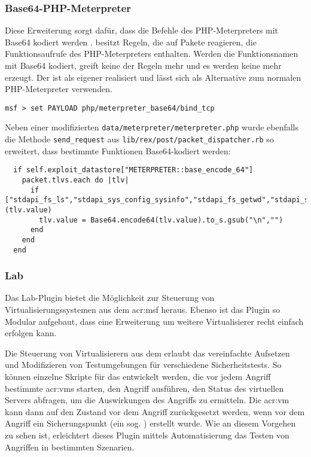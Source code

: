 \subsubsection{Base64-PHP-Meterpreter}
\label{base64-php-meterpreter}
\authors{\BK}{\HM \and \LM \and \DE \and \MW}

Diese Erweiterung sorgt dafür, dass die Befehle des PHP-Meterpreters
mit Base64 kodiert werden \cite{rfc4648}.  besitzt Regeln, die auf Pakete
reagieren, die Funktionsaufrufe des PHP-Meterpreters enthalten. Werden
die Funktionsnamen mit Base64 kodiert, greift keine der Regeln mehr und
es werden keine  mehr erzeugt.
Der  ist als eigener  realisiert und lässt sich als
Alternative zum normalen PHP-Meterpreter verwenden.

\begin{lstlisting}[language={}]
  msf > set PAYLOAD php/meterpreter_base64/bind_tcp
\end{lstlisting}

Neben einer modifizierten \texttt{data/meterpreter/meterpreter.php} wurde
ebenfalls die Methode \texttt{send\_request} aus
\texttt{lib/rex/post/packet\_dispatcher.rb} so erweitert, dass bestimmte
Funktionen Base64-kodiert werden:

\begin{lstlisting}
  if self.exploit_datastore["METERPRETER::base_encode_64"]
    packet.tlvs.each do |tlv|
      if ["stdapi_fs_ls","stdapi_sys_config_sysinfo","stdapi_fs_getwd","stdapi_sys_config_getuid"].member?(tlv.value)
        tlv.value = Base64.encode64(tlv.value).to_s.gsub("\n","")
      end
    end
  end
\end{lstlisting}

\subsubsection{Lab}
\label{lab}
\authors{\DH}{\LM \and \DE \and \MW}

Das Lab-Plugin bietet die Möglichkeit zur Steuerung von
Virtualisierungssystemen aus dem \gls{acr:msf} heraus. Ebenso ist das
Plugin so Modular aufgebaut, dass eine Erweiterung um weitere
Virtualisierer recht einfach erfolgen kann.

Die Steuerung von Virtualisierern aus dem  erlaubt das vereinfachte
Aufsetzen und Modifizieren von Testumgebungen für verschiedene
Sicherheitstests. So können einzelne Skripte für das  entwickelt
werden, die vor jedem Angriff bestimmte \glspl{acr:vm} starten, den
Angriff ausführen, den Status des virtuellen Servers abfragen, um die
Auswirkungen des Angriffs zu ermitteln. Die \gls{acr:vm} kann dann auf
den Zustand vor dem Angriff zurückgesetzt werden, wenn vor dem Angriff
ein Sicherungspunkt (ein sog. ) erstellt wurde. Wie an diesem
Vorgehen zu sehen ist, erleichtert dieses Plugin mittels Automatisierung das
Testen von Angriffen in bestimmten Szenarien.

